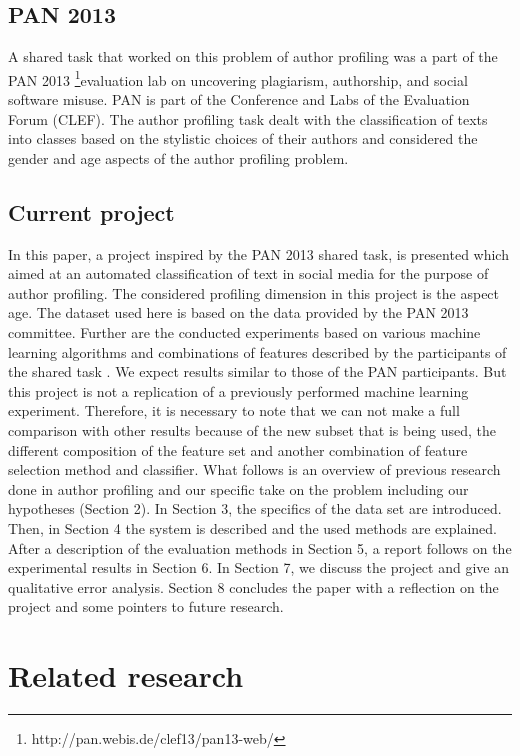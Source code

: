 \documentclass{clv3}
\begin{document}
\subsection{PAN 2013}

A shared task that worked on this problem of author profiling was a part of the PAN 2013 \footnote{http://pan.webis.de/clef13/pan13-web/}evaluation lab on uncovering plagiarism, authorship, and social software misuse. PAN is part of the Conference and Labs of the Evaluation Forum (CLEF). The author profiling task dealt with the classification of texts into classes based on the stylistic choices of their authors and considered the gender and age aspects of the author profiling problem. 

\subsection{Current project}
In this paper, a project inspired by the PAN 2013 shared task, is presented which aimed at an automated classification of text in social media  for the purpose of author profiling. The considered profiling dimension in this project is the aspect age. The dataset used here is based on the data provided by the PAN 2013 committee. Further are the conducted experiments based on various machine learning algorithms and combinations of features described by the participants of the shared task \citep{rangel2013overview}. We expect results similar to those of the PAN participants. But this project is not a replication of a previously performed machine learning experiment. Therefore, it is necessary to note that we can not make a full comparison with other results because of the new subset that is being used, the different composition of the feature set and another combination of feature selection method and classifier. What follows is an overview of previous research done in author profiling and our specific take on the problem including our hypotheses (Section 2). In Section 3, the specifics of the data set are introduced. Then,  in Section 4 the system is described and the used methods are explained. After a description of the evaluation methods in Section 5, a report follows on the experimental results in Section 6. In Section 7, we discuss the project and give an qualitative error analysis. Section 8 concludes the paper with a reflection on the project and some pointers to future research.

\section{Related research}
\end{document}
